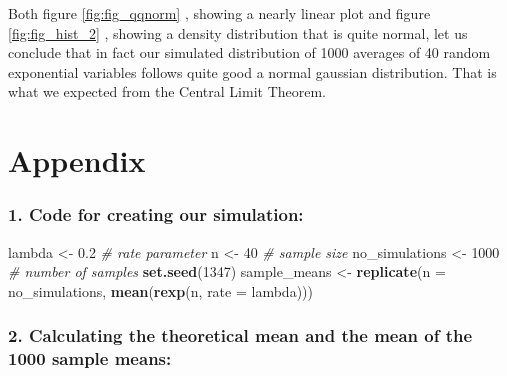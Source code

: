 \documentclass[]{article}
\newenvironment{Shaded}{\begin{snugshade}}{\end{snugshade}}
\newcommand{\KeywordTok}[1]{\textcolor[rgb]{0.13,0.29,0.53}{\textbf{#1}}}
\newcommand{\DataTypeTok}[1]{\textcolor[rgb]{0.13,0.29,0.53}{#1}}
\newcommand{\DecValTok}[1]{\textcolor[rgb]{0.00,0.00,0.81}{#1}}
\newcommand{\FloatTok}[1]{\textcolor[rgb]{0.00,0.00,0.81}{#1}}
\newcommand{\StringTok}[1]{\textcolor[rgb]{0.31,0.60,0.02}{#1}}
\newcommand{\CommentTok}[1]{\textcolor[rgb]{0.56,0.35,0.01}{\textit{#1}}}
\newcommand{\OperatorTok}[1]{\textcolor[rgb]{0.81,0.36,0.00}{\textbf{#1}}}
\newcommand{\NormalTok}[1]{#1}
\begin{document}
Both figure \ref{fig:fig_qqnorm} , showing a nearly linear plot and
figure \ref{fig:fig_hist_2} , showing a density distribution that is
quite normal, let us conclude that in fact our simulated distribution of
1000 averages of 40 random exponential variables follows quite good a
normal gaussian distribution. That is what we expected from the Central
Limit Theorem.

\pagebreak

\section{Appendix}\label{Appendix}

\hypertarget{Appendix_1}{\subsubsection{1. Code for creating our
simulation:}\label{Appendix_1}}

\begin{Shaded}
\begin{Highlighting}[]
\NormalTok{lambda <-}\StringTok{ }\FloatTok{0.2} \CommentTok{# rate parameter}
\NormalTok{n <-}\StringTok{ }\DecValTok{40} \CommentTok{# sample size}
\NormalTok{no_simulations <-}\StringTok{ }\DecValTok{1000} \CommentTok{# number of samples}
\KeywordTok{set.seed}\NormalTok{(}\DecValTok{1347}\NormalTok{)}
\NormalTok{sample_means <-}\StringTok{ }\KeywordTok{replicate}\NormalTok{(}\DataTypeTok{n =}\NormalTok{ no_simulations, }\KeywordTok{mean}\NormalTok{(}\KeywordTok{rexp}\NormalTok{(n, }\DataTypeTok{rate =}\NormalTok{ lambda)))}
\end{Highlighting}
\end{Shaded}

\subsubsection{2. Calculating the theoretical mean and the mean of the
1000 sample means:}\label{Appendix_2}

\begin{Shaded}
\end{Shaded}
\end{document}
